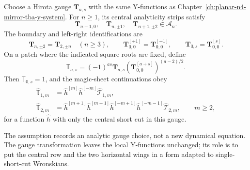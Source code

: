 \begin{assumption}
\label{ass:qsc-bold-t-and-mathbb-t-gauges}
Choose a Hirota gauge \(\mathbf T_{a,s}\) with the same Y-functions as
Chapter~\ref{ch:planar-n4-mirror-tba-y-system}.  For \(n\geq1\), its central
analyticity strips satisfy
\[
  \mathbf T_{n-1,0},\quad
  \mathbf T_{n,\pm1},\quad
  \mathbf T_{n+1,\pm2}
  \in\mathcal A_n .
\]
The boundary and left-right identifications are
\[
  \mathbf T_{n,\pm2}=\mathbf T_{2,\pm n}\quad(n\geq3),
  \qquad
  \mathbf T_{0,0}^{[+1]}=\mathbf T_{0,0}^{[-1]},
  \qquad
  \mathbf T_{0,s}=\mathbf T_{0,0}^{[s]} .
\]
On a patch where the indicated square roots are fixed, define
\begin{equation}
  \mathbb T_{a,s}
  =
  (-1)^{as}\mathbf T_{a,s}
  \left(\mathbf T_{0,0}^{[a+s]}\right)^{(a-2)/2}.
  \label{eq:qsc-mathbb-t-from-bold-t}
\end{equation}
Then \(\mathbb T_{0,s}=1\), and the magic-sheet continuations obey
\begin{align}
  \widehat{\mathbb T}_{1,m}
  &=
  \widehat h^{[m]}\widehat h^{[-m]}
  \widehat{\mathcal T}_{1,m},
  \label{eq:qsc-mathbb-t-cal-t-row-one}\\
  \widehat{\mathbb T}_{2,m}
  &=
  \widehat h^{[m+1]}\widehat h^{[m-1]}
  \widehat h^{[-m+1]}\widehat h^{[-m-1]}
  \widehat{\mathcal T}_{2,m},
  \qquad m\geq2,
  \label{eq:qsc-mathbb-t-cal-t-row-two}
\end{align}
for a function \(\widehat h\) with only the central short cut in this gauge.
\end{assumption}

The assumption records an analytic gauge choice, not a new dynamical equation.
The gauge transformation leaves the local Y-functions unchanged; its role is
to put the central row and the two horizontal wings in a form adapted to
single-short-cut Wronskians.

